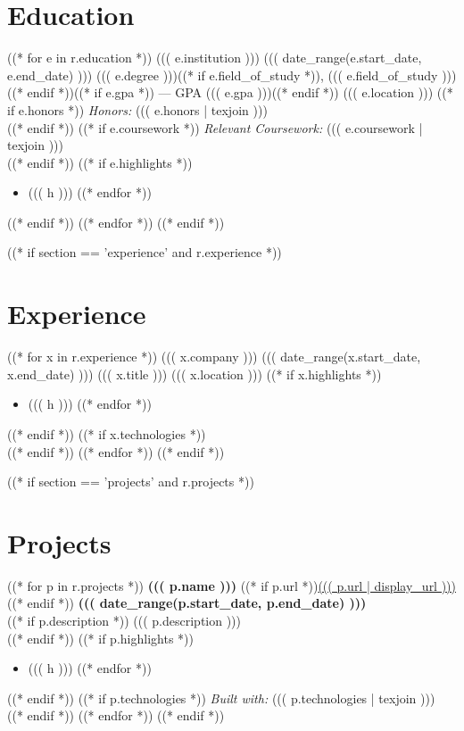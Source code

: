 \section{Education}
((* for e in r.education *))
\entryheading
  {((( e.institution )))}
  {((( date_range(e.start_date, e.end_date) )))}
  {((( e.degree )))((* if e.field_of_study *)), ((( e.field_of_study )))((* endif *))((* if e.gpa *)) \textnormal{---} GPA ((( e.gpa )))((* endif *))}
  {((( e.location )))}
((* if e.honors *))
\textit{Honors:} ((( e.honors | texjoin )))\\[2pt]
((* endif *))
((* if e.coursework *))
\textit{Relevant Coursework:} ((( e.coursework | texjoin )))\\[2pt]
((* endif *))
((* if e.highlights *))
\begin{itemize}
((* for h in e.highlights *))
  \item ((( h )))
((* endfor *))
\end{itemize}
((* endif *))
\vspace{2pt}
((* endfor *))
((* endif *))

((* if section == 'experience' and r.experience *))
\section{Experience}
((* for x in r.experience *))
\entryheading
  {((( x.company )))}
  {((( date_range(x.start_date, x.end_date) )))}
  {((( x.title )))}
  {((( x.location )))}
((* if x.highlights *))
\begin{itemize}
((* for h in x.highlights *))
  \item ((( h )))
((* endfor *))
\end{itemize}
((* endif *))
((* if x.technologies *))
\\
((* endif *))
\vspace{3pt}
((* endfor *))
((* endif *))

((* if section == 'projects' and r.projects *))
\section{Projects}
((* for p in r.projects *))
\textbf{((( p.name )))}%
((* if p.url *))\hspace{6pt}\href{((( p.url | url )))}{\small ((( p.url | display_url )))}((* endif *))%
\hfill\textbf{((( date_range(p.start_date, p.end_date) )))}\\
((* if p.description *))
{\color{muted}((( p.description )))}\\[2pt]
((* endif *))
((* if p.highlights *))
\begin{itemize}
((* for h in p.highlights *))
  \item ((( h )))
((* endfor *))
\end{itemize}
((* endif *))
((* if p.technologies *))
{\small\textit{Built with:} ((( p.technologies | texjoin )))}\\
((* endif *))
\vspace{3pt}
((* endfor *))
((* endif *))

